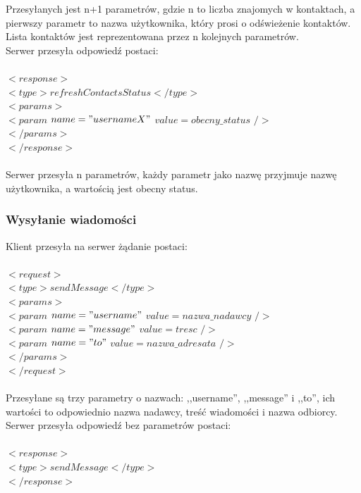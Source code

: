 \documentclass[a4paper,12pt]{article}
\begin{document}
\noindent Przesyłanych jest n+1 parametrów, gdzie n to liczba znajomych w kontaktach, a pierwszy parametr to nazwa użytkownika, który prosi o odświeżenie kontaktów. Lista kontaktów jest reprezentowana przez n kolejnych parametrów.\\
Serwer przesyła odpowiedź postaci:\\\\
\noindent  $<response>$\\
\indent    $<type>refreshContactsStatus</type>$\\
\indent    $<params>$\\
\indent \indent $<param$ $name="usernameX"$ $value=obecny\_status$ $/>$\\
\indent    $</params>$\\
$</response>$\\\\
\noindent Serwer przesyła n parametrów, każdy parametr jako nazwę przyjmuje nazwę użytkownika, a wartością jest obecny status.

\subsubsection[Wysyłanie wiadomości]{Wysyłanie wiadomości}
Klient przesyła na serwer żądanie postaci:\\\\
\noindent  $<request>$\\
\indent    $<type>sendMessage</type>$\\
\indent    $<params>$\\
\indent \indent $<param$ $name="username"$ $value=nazwa\_nadawcy$ $/>$\\
\indent \indent $<param$ $name="message"$ $value=tresc$ $/>$\\
\indent \indent $<param$ $name="to"$ $value=nazwa\_adresata$ $/>$\\
\indent    $</params>$\\
$</request>$\\\\

\noindent Przesyłane są trzy parametry o nazwach: ,,username'', ,,message'' i ,,to'', ich wartości to odpowiednio nazwa nadawcy, treść wiadomości i nazwa odbiorcy.\\
Serwer przesyła odpowiedź bez parametrów postaci:\\\\
\noindent  $<response>$\\
\indent    $<type>sendMessage</type>$\\
$</response>$
\end{document}
